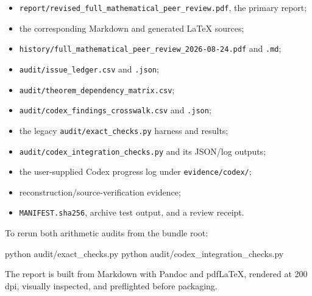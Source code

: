 \documentclass[
  10pt,
  letterpaper,
]{article}
\newenvironment{Shaded}{}{}
\newcommand{\ExtensionTok}[1]{#1}
\newcommand{\NormalTok}[1]{#1}
\providecommand{\tightlist}{%
  \setlength{\itemsep}{0pt}\setlength{\parskip}{0pt}}
\begin{document}
\begin{itemize}
\tightlist
\item
  \texttt{report/revised\_full\_mathematical\_peer\_review.pdf}, the
  primary report;
\item
  the corresponding Markdown and generated LaTeX sources;
\item
  \texttt{history/full\_mathematical\_peer\_review\_2026-08-24.pdf} and
  \texttt{.md};
\item
  \texttt{audit/issue\_ledger.csv} and \texttt{.json};
\item
  \texttt{audit/theorem\_dependency\_matrix.csv};
\item
  \texttt{audit/codex\_findings\_crosswalk.csv} and \texttt{.json};
\item
  the legacy \texttt{audit/exact\_checks.py} harness and results;
\item
  \texttt{audit/codex\_integration\_checks.py} and its JSON/log outputs;
\item
  the user-supplied Codex progress log under \texttt{evidence/codex/};
\item
  reconstruction/source-verification evidence;
\item
  \texttt{MANIFEST.sha256}, archive test output, and a review receipt.
\end{itemize}

To rerun both arithmetic audits from the bundle root:

\begin{Shaded}
\begin{Highlighting}[]
\ExtensionTok{python}\NormalTok{ audit/exact\_checks.py}
\ExtensionTok{python}\NormalTok{ audit/codex\_integration\_checks.py}
\end{Highlighting}
\end{Shaded}

The report is built from Markdown with Pandoc and pdfLaTeX, rendered at
200 dpi, visually inspected, and preflighted before packaging.
\end{document}
